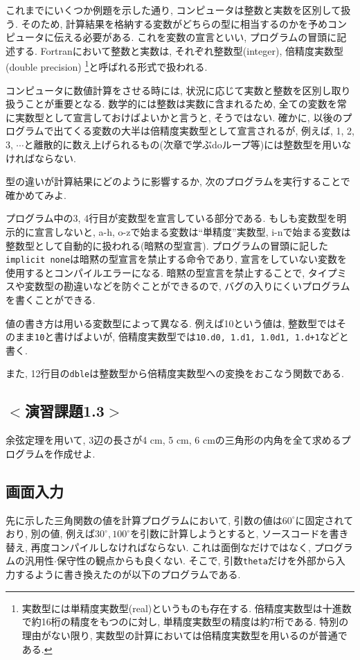 これまでにいくつか例題を示した通り, コンピュータは整数と実数を区別して扱う.
そのため, 計算結果を格納する変数がどちらの型に相当するのかを予めコンピュータに伝える必要がある. 
これを変数の宣言といい, プログラムの冒頭に記述する. 
Fortranにおいて整数と実数は, それぞれ整数型(integer), 倍精度実数型(double precision)
\footnote{実数型には単精度実数型(real)というものも存在する. 
倍精度実数型は十進数で約16桁の精度をもつのに対し, 
単精度実数型の精度は約7桁である. 
特別の理由がない限り, 実数型の計算においては倍精度実数型を用いるのが普通である.
}と呼ばれる形式で扱われる.

コンピュータに数値計算をさせる時には, 状況に応じて実数と整数を区別し取り扱うことが重要となる. 
数学的には整数は実数に含まれるため, 全ての変数を常に実数型として宣言しておけばよいかと言うと, そうではない. 
確かに, 以後のプログラムで出てくる変数の大半は倍精度実数型として宣言されるが, 
例えば, 1, 2, 3, $\cdots$と離散的に数え上げられるもの(次章で学ぶdoループ等)には整数型を用いなければならない. 

型の違いが計算結果にどのように影響するか, 次のプログラムを実行することで確かめてみよ.

プログラム中の3, 4行目が変数型を宣言している部分である. 
もしも変数型を明示的に宣言しないと, a-h, o-zで始まる変数は``単精度''実数型,
i-nで始まる変数は整数型として自動的に扱われる(暗黙の型宣言). 
プログラムの冒頭に記した\verb|implicit none|は暗黙の型宣言を禁止する命令であり,
宣言をしていない変数を使用するとコンパイルエラーになる.
暗黙の型宣言を禁止することで, タイプミスや変数型の勘違いなどを防ぐことができるので,
バグの入りにくいプログラムを書くことができる.

値の書き方は用いる変数型によって異なる.
例えば10という値は, 整数型ではそのまま\verb|10|と書けばよいが,
倍精度実数型では\verb|10.d0, 1.d1, 1.0d1, 1.d+1|などと書く. 

また, 12行目の\verb|dble|は整数型から倍精度実数型への変換をおこなう関数である. \\


\subsection*{$<$演習課題1.3$>$}
余弦定理を用いて, 3辺の長さが4 cm, 5 cm, 6 cmの三角形の内角を全て求めるプログラムを作成せよ. 

\subsection*{画面入力}
先に示した三角関数の値を計算プログラムにおいて, 引数の値は$60^\circ$に固定されており, 
別の値, 例えば$30^\circ, 100^\circ$を引数に計算しようとすると, ソースコードを書き替え, 
再度コンパイルしなければならない. 
これは面倒なだけではなく, プログラムの汎用性$\cdot$保守性の観点からも良くない. 
そこで, 引数\verb|theta|だけを外部から入力するように書き換えたのが以下のプログラムである. 


